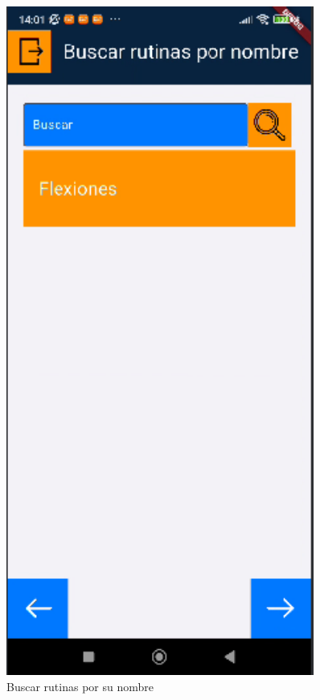\begin{figure}[H]
\begin{minipage}{0.45\textwidth}
   \end{minipage}%
   \hspace{0.5cm}
   \begin{minipage}{0.45\textwidth}
      \centering
      \includegraphics[width=0.9\textwidth]{pantallas/buscarRutina.png}
      \caption{Buscar rutinas por su nombre}
      \label{fig:buscarRutina}
   \end{minipage}
\end{figure}


